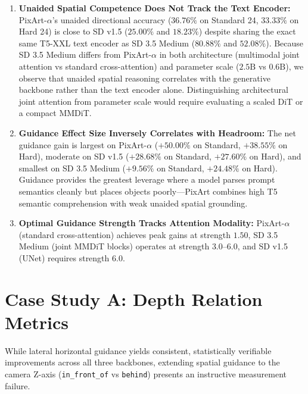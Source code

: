 \documentclass[10pt,twocolumn,letterpaper]{article}
\begin{document}
\begin{enumerate}
    \item \textbf{Unaided Spatial Competence Does Not Track the Text Encoder:} PixArt-$\alpha$'s unaided directional accuracy ($36.76\%$ on Standard 24, $33.33\%$ on Hard 24) is close to SD v1.5 ($25.00\%$ and $18.23\%$) despite sharing the exact same T5-XXL text encoder as SD 3.5 Medium ($80.88\%$ and $52.08\%$). Because SD 3.5 Medium differs from PixArt-$\alpha$ in both architecture (multimodal joint attention vs standard cross-attention) and parameter scale ($2.5\text{B}$ vs $0.6\text{B}$), we observe that unaided spatial reasoning correlates with the generative backbone rather than the text encoder alone. Distinguishing architectural joint attention from parameter scale would require evaluating a scaled DiT or a compact MMDiT.
    \item \textbf{Guidance Effect Size Inversely Correlates with Headroom:} The net guidance gain is largest on PixArt-$\alpha$ ($+50.00\%$ on Standard, $+38.55\%$ on Hard), moderate on SD v1.5 ($+28.68\%$ on Standard, $+27.60\%$ on Hard), and smallest on SD 3.5 Medium ($+9.56\%$ on Standard, $+24.48\%$ on Hard). Guidance provides the greatest leverage where a model parses prompt semantics cleanly but places objects poorly---PixArt combines high T5 semantic comprehension with weak unaided spatial grounding.
    \item \textbf{Optimal Guidance Strength Tracks Attention Modality:} PixArt-$\alpha$ (standard cross-attention) achieves peak gains at strength $1.50$, SD 3.5 Medium (joint MMDiT blocks) operates at strength $3.0\text{--}6.0$, and SD v1.5 (UNet) requires strength $6.0$.
\end{enumerate}

\section{Case Study A: Depth Relation Metrics}

While lateral horizontal guidance yields consistent, statistically verifiable improvements across all three backbones, extending spatial guidance to the camera Z-axis (\texttt{in\_front\_of} vs \texttt{behind}) presents an instructive measurement failure.
\end{document}
